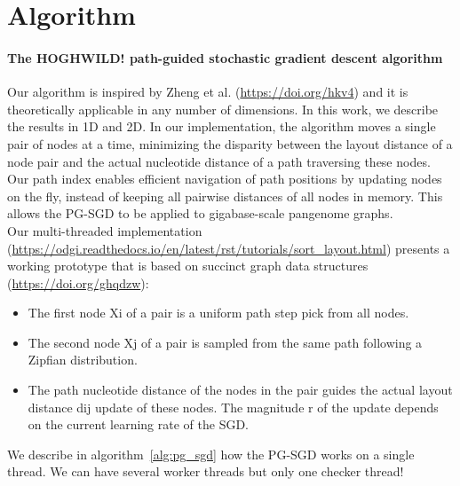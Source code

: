 \documentclass{bioinfo}
\theoremstyle{definition}
\begin{document}
\section{Algorithm}

\paragraph{The HOGHWILD! path-guided stochastic gradient descent algorithm}
Our algorithm is inspired by Zheng et al. (\url{https://doi.org/hkv4}) and it is theoretically applicable in any number of dimensions.
In this work, we describe the results in 1D and 2D.
In our implementation, the algorithm moves a single pair of nodes at a time, minimizing the disparity between the layout distance of a node pair and the actual nucleotide distance of a path traversing these nodes.
Our path index enables efficient navigation of path positions by updating nodes on the fly, instead of keeping all pairwise distances of all nodes in memory.
This allows the PG-SGD to be applied to gigabase-scale pangenome graphs. \\
Our multi-threaded implementation (\url{https://odgi.readthedocs.io/en/latest/rst/tutorials/sort_layout.html}) presents a working prototype that is based on succinct graph data structures (\url{https://doi.org/ghqdzw}):
\begin{itemize}
	\item The first node Xi of a pair is a uniform path step pick from all nodes.
	\item The second node Xj of a pair is sampled from the same path following a Zipfian distribution. 
	\item The path nucleotide distance of the nodes in the pair guides the actual layout distance dij update of these nodes. The magnitude r of the update depends on the current learning rate of the SGD.
\end{itemize}
We describe in algorithm~\ref{alg:pg_sgd} how the PG-SGD works on a single thread. We can have several worker threads but only one checker thread!
\end{document}
